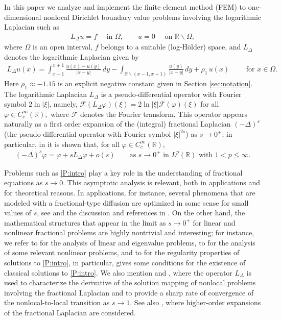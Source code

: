 \documentclass[11 pt]{article}
\numberwithin{equation}{section}
\def\R{\mathbb{R}}
\begin{document}
In this paper we analyze and implement the finite element method (FEM) to one-dimensional nonlocal Dirichlet boundary value problems involving the logarithmic Laplacian such as
\begin{align}\label{P:intro}
    L_\Delta u = f \quad \text{ in }\Omega,\qquad u=0\quad \text{ on }\R\backslash \Omega,
\end{align}
where $\Omega$ is an open interval, $f$ belongs to a suitable (log-Hölder) space, and $L_\Delta$ denotes the logarithmic Laplacian given by
\begin{align}\label{LL}
     L_\Delta u(x)
     =
     \int_{x-1}^{x+1}\frac{u(x)-u(y)}{|x-y|}\, dy
     -\int_{\R\backslash(x-1,x+1)}\frac{u(y)}{|x-y|}\, dy
     +\rho_1\, u(x)\qquad \text{ for }x\in \Omega.
 \end{align}
 Here $\rho_1\approx-1.15$ is an explicit negative constant given in Section \ref{sec:notation}. The logarithmic Laplacian $L_\Delta$ is a pseudo-differential operator with Fourier symbol $2\ln|\xi|$, namely, ${\mathcal F}(L_\Delta \varphi)(\xi)=2\ln|\xi| {\mathcal F}(\varphi)(\xi)$ for all $\varphi\in C^\infty_c(\R),$ where ${\mathcal F}$ denotes the Fourier transform.  This operator appears naturally as a first order expansion of the (integral) fractional Laplacian $(-\Delta)^s$ (the pseudo-differential operator with Fourier symbol $|\xi|^{2s}$) as $s\to 0^+$; in particular, in \cite[Theorem 1.1]{CW19} it is shown that, for all $\varphi\in C^\infty_c(\R)$,
\begin{align}\label{intro:exp}
(-\Delta)^s\varphi = \varphi + sL_\Delta \varphi + o(s)\qquad \text{as $s\to 0^+$ in }L^p(\R) \text{ with }1<p\leq \infty.
\end{align}

 Problems such as \eqref{P:intro} play a key role in the understanding of fractional equations as $s\to 0$. This asymptotic analysis is relevant, both in applications and for theoretical reasons.  In applications, for instance, several phenomena that are modeled with a fractional-type diffusion are optimized in some sense for small values of $s$, see \cite{Caffarelli17} and the discussion and references in \cite{HSS22}.  On the other hand,  the mathematical structures that appear in the limit as $s\to 0^+$ for linear and nonlinear fractional problems are highly nontrivial and interesting; for instance, we refer to \cite{CW19,LW21,FJW22} for the analysis of linear and eigenvalue problems, to \cite{AS22,HSS22} for the analysis of some relevant nonlinear problems, and to \cite{CS22} for the regularity properties of solutions to \eqref{P:intro}, in particular, \cite[Theorem 1.1]{CS22} gives some conditions for the existence of classical solutions to \eqref{P:intro}.  We also mention \cite{JSW20} and \cite{JSW24}, where the operator $L_\Delta$ is used to characterize the derivative of the solution mapping of nonlocal problems involving the fractional Laplacian and to provide a sharp rate of convergence of the nonlocal-to-local transition as $s\to1$. See also \cite{chen2023taylor}, where higher-order expansions of the fractional Laplacian are considered.
\end{document}
